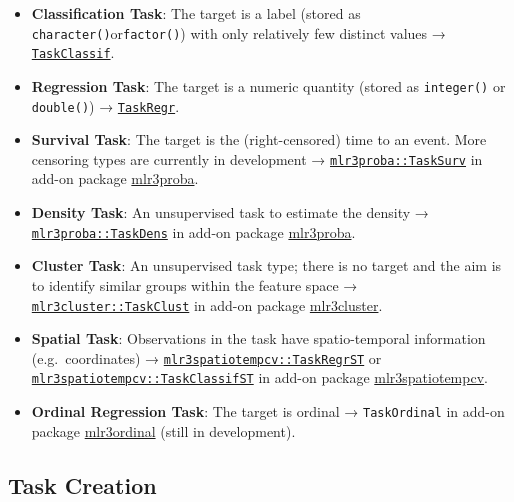 \documentclass[
]{scrbook}
\begin{document}
\begin{itemize}
\item
  \textbf{Classification Task}: The target is a label (stored as \texttt{character()}or\texttt{factor()}) with only relatively few distinct values → \href{https://mlr3.mlr-org.com/reference/TaskClassif.html}{\texttt{TaskClassif}}.
\item
  \textbf{Regression Task}: The target is a numeric quantity (stored as \texttt{integer()} or \texttt{double()}) → \href{https://mlr3.mlr-org.com/reference/TaskRegr.html}{\texttt{TaskRegr}}.
\item
  \textbf{Survival Task}: The target is the (right-censored) time to an event. More censoring types are currently in development → \href{https://mlr3proba.mlr-org.com/reference/TaskSurv.html}{\texttt{mlr3proba::TaskSurv}} in add-on package \href{https://mlr3proba.mlr-org.com}{mlr3proba}.
\item
  \textbf{Density Task}: An unsupervised task to estimate the density → \href{https://mlr3proba.mlr-org.com/reference/TaskDens.html}{\texttt{mlr3proba::TaskDens}} in add-on package \href{https://mlr3proba.mlr-org.com}{mlr3proba}.
\item
  \textbf{Cluster Task}: An unsupervised task type; there is no target and the aim is to identify similar groups within the feature space → \href{https://mlr3cluster.mlr-org.com/reference/TaskClust.html}{\texttt{mlr3cluster::TaskClust}} in add-on package \href{https://mlr3cluster.mlr-org.com}{mlr3cluster}.
\item
  \textbf{Spatial Task}: Observations in the task have spatio-temporal information (e.g.~coordinates) → \href{https://www.rdocumentation.org/packages/mlr3spatiotempcv/topics/TaskRegrST}{\texttt{mlr3spatiotempcv::TaskRegrST}} or \href{https://www.rdocumentation.org/packages/mlr3spatiotempcv/topics/TaskClassifST}{\texttt{mlr3spatiotempcv::TaskClassifST}} in add-on package \href{https://mlr3spatiotempcv.mlr-org.com}{mlr3spatiotempcv}.
\item
  \textbf{Ordinal Regression Task}: The target is ordinal → \texttt{TaskOrdinal} in add-on package \href{https://github.com/mlr-org/mlr3ordinal}{mlr3ordinal} (still in development).
\end{itemize}

\hypertarget{tasks-creation}{%
\subsection{Task Creation}\label{tasks-creation}}
\end{document}
